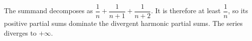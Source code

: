 The summand decomposes as $\dfrac{1}{n}+\dfrac{1}{n+1}+\dfrac{1}{n+2}$. It is therefore at least $\dfrac{1}{n}$, so its positive partial sums dominate the divergent harmonic partial sums. The series diverges to $\boxed{+\infty}$.
